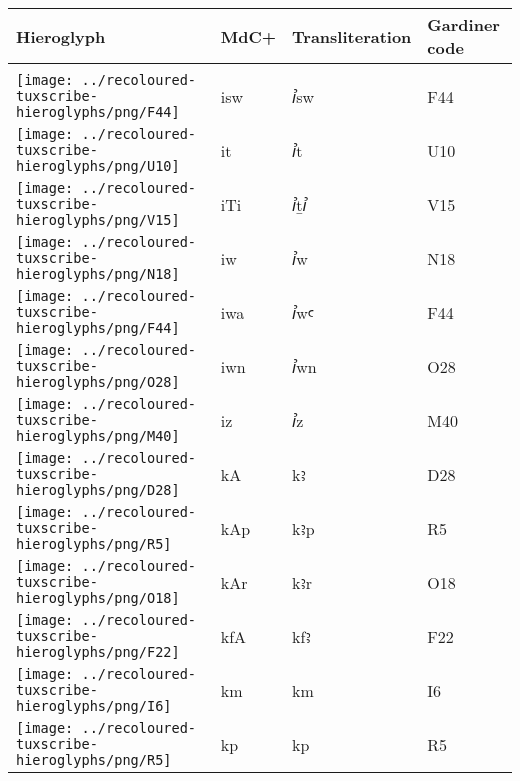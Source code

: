 \begin{center}
	\begin{tabularx}{\linewidth}{YYYY}
		Hieroglyph & MdC+ & Transliteration & Gardiner code\\
		\hline\\
		\texttt{[image: ../recoloured-tuxscribe-hieroglyphs/png/F44]} & isw & ꞽsw & F44 \\ 
		\texttt{[image: ../recoloured-tuxscribe-hieroglyphs/png/U10]} & it & ꞽt & U10 \\ 
		\texttt{[image: ../recoloured-tuxscribe-hieroglyphs/png/V15]} & iTi & ꞽṯꞽ & V15 \\ 
		\texttt{[image: ../recoloured-tuxscribe-hieroglyphs/png/N18]} & iw & ꞽw & N18 \\ 
		\texttt{[image: ../recoloured-tuxscribe-hieroglyphs/png/F44]} & iwa & ꞽwꜥ & F44 \\ 
		\texttt{[image: ../recoloured-tuxscribe-hieroglyphs/png/O28]} & iwn & ꞽwn & O28 \\ 
		\texttt{[image: ../recoloured-tuxscribe-hieroglyphs/png/M40]} & iz & ꞽz & M40 \\ 
		\texttt{[image: ../recoloured-tuxscribe-hieroglyphs/png/D28]} & kA & kꜣ & D28 \\ 
		\texttt{[image: ../recoloured-tuxscribe-hieroglyphs/png/R5]} & kAp & kꜣp & R5 \\ 
		\texttt{[image: ../recoloured-tuxscribe-hieroglyphs/png/O18]} & kAr & kꜣr & O18 \\ 
		\texttt{[image: ../recoloured-tuxscribe-hieroglyphs/png/F22]} & kfA & kfꜣ & F22 \\ 
		\texttt{[image: ../recoloured-tuxscribe-hieroglyphs/png/I6]} & km & km & I6 \\ 
		\texttt{[image: ../recoloured-tuxscribe-hieroglyphs/png/R5]} & kp & kp & R5 \\ 
	\end{tabularx}
\end{center}


